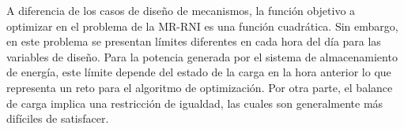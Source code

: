 A diferencia de los casos de diseño de mecanismos, la función objetivo a optimizar en el problema de la MR-RNI es una función cuadrática. Sin embargo, en este problema se presentan límites diferentes en cada hora del día para las variables de diseño. Para la potencia generada por el sistema de almacenamiento de energía, este límite depende del estado de la carga en la hora anterior lo que representa un reto para el algoritmo de optimización. Por otra parte, el balance de carga implica una restricción de igualdad, las cuales son generalmente más difíciles de satisfacer. 